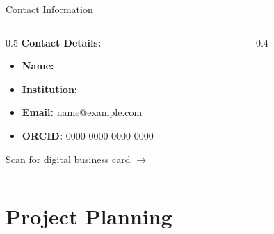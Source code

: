 \begin{frame}{Contact Information}
    \begin{columns}[T]
        \begin{column}{0.5\textwidth}
            \textbf{Contact Details:}

            \vspace{0.3cm}

            \begin{itemize}
                \item[] \textbf{Name:} \AuthorName
                \item[] \textbf{Institution:} \AuthorAffiliation
                \item[] \textbf{Email:} name@example.com
                \item[] \textbf{ORCID:} 0000-0000-0000-0000
            \end{itemize}

            \vspace{0.5cm}

            Scan for digital business card $\rightarrow$
        \end{column}
        \begin{column}{0.4\textwidth}
            \centering
        \end{column}
    \end{columns}
\end{frame}

\section{Project Planning}

